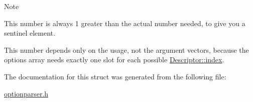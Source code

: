 \begin{DoxyNote}{Note}
\begin{DoxyItemize}
\item This number is always 1 greater than the actual number needed, to give you a sentinel element. \item This number depends only on the {\ttfamily usage}, not the argument vectors, because the {\ttfamily options} array needs exactly one slot for each possible \hyperlink{structoption_1_1Descriptor_a1fee8ac44f529c99ac2b1149b4c391b1}{Descriptor\+::index}. \end{DoxyItemize}

\end{DoxyNote}


The documentation for this struct was generated from the following file\+:\begin{DoxyCompactItemize}
\item 
\hyperlink{optionparser_8h}{optionparser.\+h}\end{DoxyCompactItemize}
